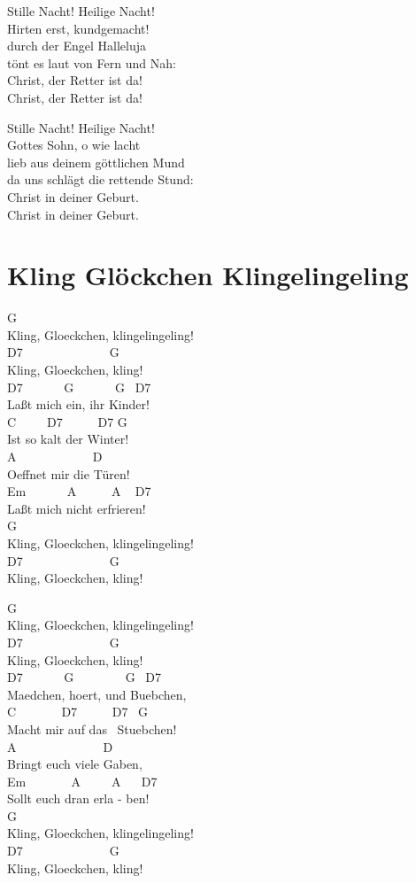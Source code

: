 \documentclass[
  letterpaper,
  twoside=false]{scrbook}
\begin{document}
Stille Nacht! Heilige Nacht!\\
Hirten erst, kundgemacht!\\
durch der Engel Halleluja\\
tönt es laut von Fern\textquotesingle{} und Nah:\\
Christ, der Retter ist da!\\
Christ, der Retter ist da!

Stille Nacht! Heilige Nacht!\\
Gottes Sohn, o wie lacht\\
lieb\textquotesingle{} aus deinem göttlichen Mund\\
da uns schlägt die rettende Stund\textquotesingle:\\
Christ in deiner Geburt.\\
Christ in deiner Geburt.

\hypertarget{kling-gluxf6ckchen-klingelingeling}{%
\chapter{Kling Glöckchen
Klingelingeling}\label{kling-gluxf6ckchen-klingelingeling}}

G\\
Kling, Gloeckchen, klingelingeling!\\
D7 ~ ~ ~ ~ ~ ~ ~ ~ G\\
Kling, Gloeckchen, kling!\\
D7 ~ ~ ~ ~G ~ ~ ~ ~G ~D7\\
Laßt mich ein, ihr Kinder!\\
C ~ ~ ~D7 ~ ~ ~ D7 G\\
Ist so kalt der Winter!\\
A ~ ~ ~ ~ ~ ~ ~ D\\
Oeffnet mir die Türen!\\
Em ~ ~ ~ ~A ~ ~ ~ A ~ D7\\
Laßt mich nicht erfrieren!\\
G\\
Kling, Gloeckchen, klingelingeling!\\
D7 ~ ~ ~ ~ ~ ~ ~ ~ G\\
Kling, Gloeckchen, kling! ~

G\\
Kling, Gloeckchen, klingelingeling!\\
D7 ~ ~ ~ ~ ~ ~ ~ ~ G\\
Kling, Gloeckchen, kling!\\
D7 ~ ~ ~ ~G ~ ~ ~ ~ ~G ~D7\\
Maedchen, hoert, und Buebchen,\\
C ~ ~ ~ ~ D7 ~ ~ ~ D7 ~G\\
Macht mir auf das ~Stuebchen!\\
A ~ ~ ~ ~ ~ ~ ~ ~ D\\
Bringt euch viele Gaben,\\
Em ~ ~ ~ ~ A ~ ~ ~A ~ ~D7\\
Sollt euch dran erla - ben!\\
G\\
Kling, Gloeckchen, klingelingeling!\\
D7 ~ ~ ~ ~ ~ ~ ~ ~ G\\
Kling, Gloeckchen, kling! ~
\end{document}

